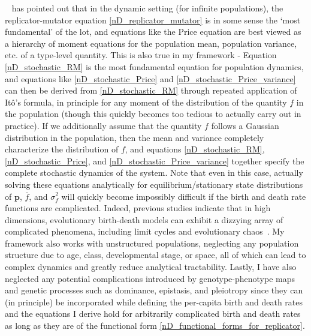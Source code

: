 ~\cite{lion_theoretical_2018} has pointed out that in the dynamic setting (for infinite populations), the replicator-mutator equation \eqref{nD_replicator_mutator} is in some sense the `most fundamental' of the lot, and equations like the Price equation are best viewed as a hierarchy of moment equations for the population mean, population variance, etc. of a type-level quantity. This is also true in my framework - Equation \eqref{nD_stochastic_RM} is the most fundamental equation for population dynamics, and equations like \eqref{nD_stochastic_Price} and \eqref{nD_stochastic_Price_variance} can then be derived from \eqref{nD_stochastic_RM} through repeated application of It\^o's formula, in principle for any moment of the distribution of the quantity $f$ in the population (though this quickly becomes too tedious to actually carry out in practice). If we additionally assume that the quantity $f$ follows a Gaussian distribution in the population, then the mean and variance completely characterize the distribution of $f$, and equations \eqref{nD_stochastic_RM}, \eqref{nD_stochastic_Price}, and \eqref{nD_stochastic_Price_variance} together specify the complete stochastic dynamics of the system. Note that even in this case, actually solving these equations analytically for equilibrium/stationary state distributions of $\mathbf{p}$, $\overline{f}$, and $\sigma^2_f$ will quickly become impossibly difficult if the birth and death rate functions are complicated. Indeed, previous studies indicate that in high dimensions, evolutionary birth-death models can exhibit a dizzying array of complicated phenomena, including limit cycles and evolutionary chaos~\citep{doebeli_diversity_2017}. My framework also works with unstructured populations, neglecting any population structure due to age, class, developmental stage, or space, all of which can lead to complex dynamics and greatly reduce analytical tractability. Lastly, I have also neglected any potential complications introduced by genotype-phenotype maps and genetic processes such as dominance, epistasis, and pleiotropy since they can (in principle) be incorporated while defining the per-capita birth and death rates and the equations I derive hold for arbitrarily complicated birth and death rates as long as they are of the functional form \eqref{nD_functional_forms_for_replicator}.

